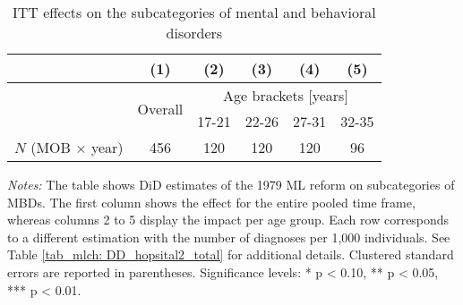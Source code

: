 \newpage
{} 
\vspace*{\fill}
\begin{table}[H] \centering 
	\begin{threeparttable} \centering \caption{ITT effects on the subcategories of mental and behavioral disorders}\label{tab_mlch: ITT_across_d5subcategories_per_age_group_total}
		{\def\sym#1{\ifmmode^{#1}\else\(^{#1}\)\fi} 
			\begin{tabular}{l*{5}{c}}
				\toprule 
				&\multicolumn{1}{c}{(1)}&\multicolumn{1}{c}{(2)}&\multicolumn{1}{c}{(3)}&\multicolumn{1}{c}{(4)}&\multicolumn{1}{c}{(5)}\\
				\midrule
				&\multirow{2}{*}{Overall} & \multicolumn{4}{c}{Age brackets [years]} \\ 
				\cmidrule(lr){3-6}
				&&\multicolumn{1}{c}{17-21}&\multicolumn{1}{c}{22-26}&\multicolumn{1}{c}{27-31}&\multicolumn{1}{c}{32-35}\\
				
				\midrule
				
				
				\midrule
				\(N\) (MOB $\times$ year)& 456 & 120 & 120 & 120 & 96\\
				\bottomrule 
		\end{tabular}}
	\end{threeparttable} 
	\begin{minipage}{0.9\linewidth}
		\scriptsize \emph{Notes:} The table shows DiD estimates of the 1979 ML reform on subcategories of MBDs. The first column shows the effect for the entire pooled time frame, whereas columns 2 to 5 display the impact per age group. Each row corresponds to a different estimation with the number of diagnoses per 1,000 individuals. See Table \ref{tab_mlch: DD_hopsital2_total} for additional details. Clustered standard errors are reported in parentheses. \newline Significance levels: * p < 0.10, ** p < 0.05, *** p < 0.01. \newline 	%
	\end{minipage}
\end{table} 
\vspace*{\fill}\clearpage 
\restoregeometry

